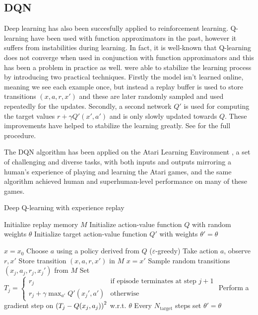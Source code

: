 \subsection{DQN}

Deep learning has also been succesfully applied to reinforcement learning. Q-learning have been used with function approximators in the past\cite{neco}, however it suffers from instabilities during learning. In fact, it is well-known that Q-learning does not converge when used in conjunction with function approximators \cite{...} and this has been a problem in practice as well. \citet{mnih2015human} were able to stabilize the learning process by introducing two practical techniques. Firstly the model isn't learned online, meaning we see each example once, but instead a replay buffer is used to store transitions $(x, a, r, x')$ and these are later randomly sampled and used repeatedly for the updates. Secondly, a second network $Q'$ is used for computing the target values $r + \gamma Q'(x', a')$ and is only slowly updated towards $Q$. These improvements have helped to stabilize the learning greatly. See  for the full procedure.

The DQN algorithm has been applied on the Atari Learning Environment \cite{atari}, a set of challenging and diverse tasks, with both inputs and outputs mirroring a human's experience of playing and learning the Atari games, and the same algorithm achieved human and superhuman-level performance on many of these games.

\begin{algorithm}
\caption{Deep Q-learning with experience replay}
\begin{algorithmic}\label{alg:dqn}

    \STATE Initialize replay memory $M$
    \STATE Initialize action-value function $Q$ with random weights $\theta$
    \STATE Initialize target action-value function $Q'$ with weights $\theta'=\theta$

    \STATE $x=x_0$
	\STATE Choose $a$ using a policy derived from $Q$ ($\varepsilon$-greedy)
	\STATE Take action $a$, observe $r, x'$
	\STATE Store transition $(x, a, r, x')$ in $M$
	\STATE $x = x'$
	\STATE Sample random transitions $(x_j, a_j, r_j, x_j')$ from $M$
	\STATE Set $T_j=\begin{cases}
      r_j & \text{if episode terminates at step } j+1\\
      r_j + \gamma \max_{a'} Q'(x_j', a') & \text{otherwise}
    \end{cases}$
    \STATE Perform a gradient step on $\left( {T_j - Q(x_j, a_j)} \right)^2$ w.r.t. $\theta$ 
    \STATE Every $N_\text{target}$ steps set $\theta'=\theta$
	\ENDWHILE
	\ENDFOR
	
\end{algorithmic}
\end{algorithm}

